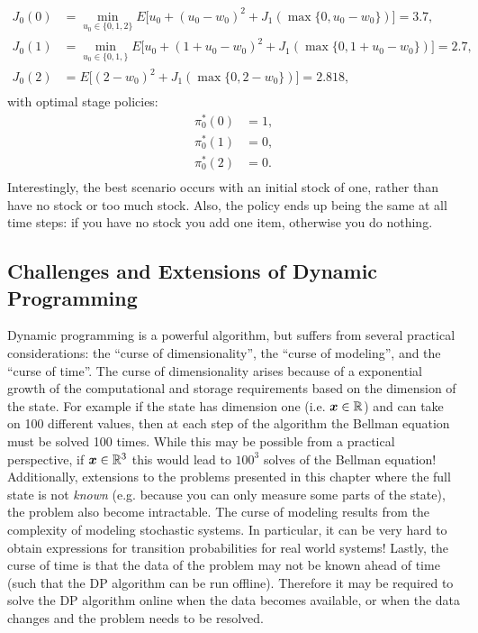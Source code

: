 \begin{example}
\begin{equation*}
\begin{split}
J_0(0) &= \underset{u_0 \in \{0,1,2\}}{\min} E\big[u_0 + (u_0 - w_0)^2 + J_1(\max\{0, u_0 - w_0\}) \big] = 3.7, \\
J_0(1) &= \underset{u_0 \in \{0,1,\}}{\min} E\big[u_0 + (1 + u_0 - w_0)^2 + J_1(\max\{0, 1 + u_0 - w_0\})  \big] = 2.7,\\
J_0(2) &= E\big[(2 - w_0)^2  + J_1(\max\{0, 2 - w_0\}) \big] = 2.818,\\
\end{split}
\end{equation*}
with optimal stage policies:
\begin{equation*}
\begin{split}
\pi^*_0(0) &= 1, \\ 
\pi^*_0(1) &= 0, \\ 
\pi^*_0(2) &= 0. \\ 
\end{split}
\end{equation*}
Interestingly, the best scenario occurs with an initial stock of one, rather than have no stock or too much stock. Also, the policy ends up being the same at all time steps: if you have no stock you add one item, otherwise you do nothing.
\end{example}

\subsection{Challenges and Extensions of Dynamic Programming}
Dynamic programming is a powerful algorithm, but suffers from several practical considerations: the ``curse of dimensionality'', the ``curse of modeling'', and the ``curse of time''. The curse of dimensionality arises because of a exponential growth of the computational and storage requirements based on the dimension of the state. For example if the state has dimension one (i.e. $\bm{x} \in \mathbb{R}$) and can take on 100 different values, then at each step of the algorithm the Bellman equation must be solved 100 times. While this may be possible from a practical perspective, if $\bm{x} \in \mathbb{R}^3$ this would lead to $100^3$ solves of the Bellman equation! Additionally, extensions to the problems presented in this chapter where the full state is not \textit{known} (e.g. because you can only measure some parts of the state), the problem also become intractable. The curse of modeling results from the complexity of modeling stochastic systems. In particular, it can be very hard to obtain expressions for transition probabilities for real world systems! Lastly, the curse of time is that the data of the problem may not be known ahead of time (such that the DP algorithm can be run offline). Therefore it may be required to solve the DP algorithm online when the data becomes available, or when the data changes and the problem needs to be resolved.

